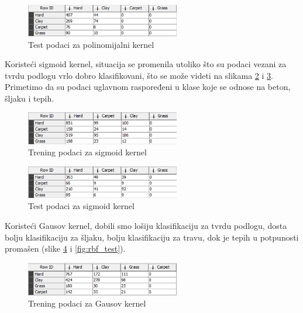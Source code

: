 \documentclass[a4paper]{article}
\begin{document}
\begin{figure}[H]
	\begin{center}
		\includegraphics[width=0.6\textwidth]{Klasifikacija/SVM/poly_test}
	\end{center}
	\caption{Test podaci za polinomijalni kernel}
	\label{fig:poly_test}
\end{figure}


Koristeći sigmoid kernel, situacija se promenila utoliko što su podaci vezani za tvrdu podlogu
vrlo dobro klasifikovani, što se može videti na slikama \ref{fig:sigmoid_training} i \ref{fig:sigmoid_test}.
Primetimo da su podaci uglavnom raspoređeni u klase koje se odnose na beton, šljaku i tepih.

\begin{figure}[H]
	\begin{center}
		\includegraphics[width=0.6\textwidth]{Klasifikacija/SVM/sigmoid_training}
	\end{center}
	\caption{Trening podaci za sigmoid kernel}
	\label{fig:sigmoid_training}
\end{figure}

\begin{figure}[H]
	\begin{center}
		\includegraphics[width=0.6\textwidth]{Klasifikacija/SVM/sigmoid_test}
	\end{center}
	\caption{Test podaci za sigmoid kernel}
	\label{fig:sigmoid_test}
\end{figure}

Koristeći Gausov kernel, dobili smo lošiju klasifikaciju za tvrdu podlogu, dosta bolju klasifikaciju za šljaku, bolju klasifikaciju za travu, dok
je tepih u potpunosti promašen (slike \ref{fig:rbf_training} i \ref{fig:rbf_test}).\\

\begin{figure}[H]
	\begin{center}
		\includegraphics[width=0.6\textwidth]{Klasifikacija/SVM/rbf_training}
	\end{center}
	\caption{Trening podaci za Gausov kernel}
	\label{fig:rbf_training}
\end{figure}
\end{document}
